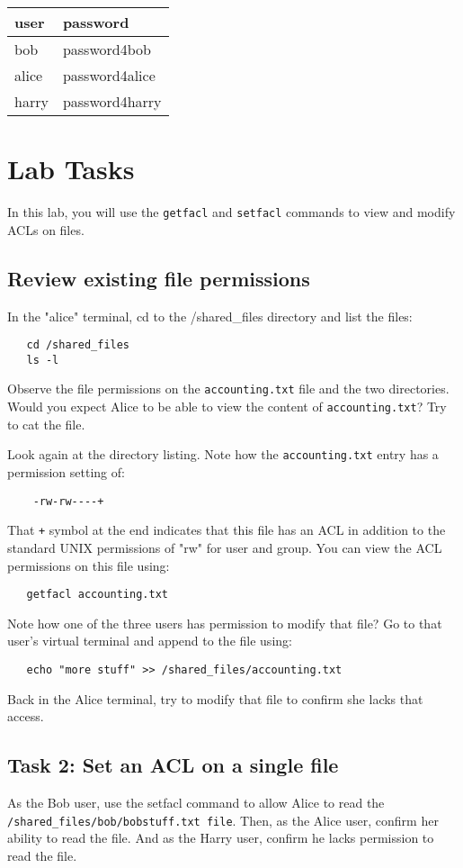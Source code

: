 \medskip
{\begin{tabular}{ l | l  }

 \hline
 user & password \\ \hline
 bob & password4bob \\
 alice & password4alice \\
 harry & password4harry \\
\end{tabular}

\section{Lab Tasks}
In this lab, you will use the {\tt getfacl} and {\tt setfacl} commands to 
view and modify ACLs on files.

\subsection{Review existing file permissions}
In the "alice" terminal, cd to the /shared\_files directory and list
the files:
\begin{verbatim}
   cd /shared_files
   ls -l
\end{verbatim}
\noindent
Observe the file permissions on the {\tt accounting.txt} file and the two
directories.  Would you expect Alice to be able to view the content of
{\tt accounting.txt}?  Try to cat the file.

Look again at the directory listing.  Note how the {\tt accounting.txt}
entry has a permission setting of:
\begin{verbatim}
    -rw-rw----+
\end{verbatim}
That {\tt +} symbol at the end indicates that this file has an ACL in addition
to the standard UNIX permissions of "rw" for user and group.  You can view the
ACL permissions on this file using:
\begin{verbatim}
   getfacl accounting.txt
\end{verbatim}

Note how one of the three users has permission to modify that file?  Go to that
user's virtual terminal and append to the file using:
\begin{verbatim}
   echo "more stuff" >> /shared_files/accounting.txt
\end{verbatim}

Back in the Alice terminal, try to modify that file to confirm she lacks that access.


\subsection{Task 2: Set an ACL on a single file}
As the Bob user, use the setfacl command to allow Alice to read the
{\tt /shared\_files/bob/bobstuff.txt file}.  Then, as the Alice user,
confirm her ability to read the file.  And as the Harry user, confirm
he lacks permission to read the file.


}
